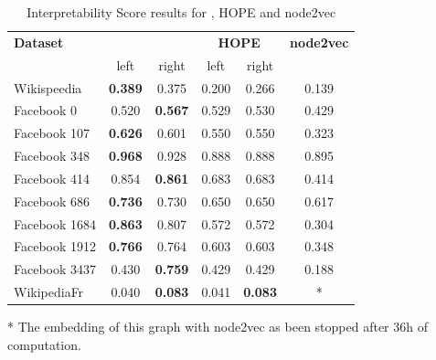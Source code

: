 \begin{table}[t]
    \caption{Interpretability Score results for \parfaite{}, HOPE and node2vec}
    \begin{center}
        \begin{tabular}{l|c|c|c|c|c}
            \hline
            \textbf{Dataset} & \multicolumn{2}{|c|}{\textbf{\parfaite{}}} & \multicolumn{2}{|c|}{\textbf{HOPE}} & \textbf{node2vec}\\
            & left & right & left & right\\
            \hline
Wikispeedia  &  \textbf{0.389} & 0.375 & 0.200 & 0.266 & 0.139\\
Facebook 0 & 0.520 & \textbf{0.567} & 0.529 & 0.530 & 0.429\\
Facebook 107 & \textbf{0.626} & 0.601 & 0.550 & 0.550 & 0.323\\
Facebook 348 & \textbf{0.968} & 0.928 & 0.888 & 0.888 & 0.895\\
Facebook 414 & 0.854 & \textbf{0.861} & 0.683 & 0.683 & 0.414\\
Facebook 686 & \textbf{0.736} & 0.730 & 0.650 & 0.650 & 0.617\\
Facebook 1684 & \textbf{0.863} & 0.807 & 0.572 & 0.572 & 0.304\\
Facebook 1912 & \textbf{0.766} & 0.764 & 0.603 & 0.603 & 0.348\\
Facebook 3437 & 0.430 & \textbf{0.759} & 0.429 & 0.429 & 0.188\\
WikipediaFr  &  0.040 & \textbf{0.083} & 0.041 & \textbf{0.083} & *\\
\hline
        \end{tabular}
    \end{center}
    \label{tab:IS_scores}
    * The embedding of this graph with node2vec as been stopped after 36h of computation.
\end{table}



